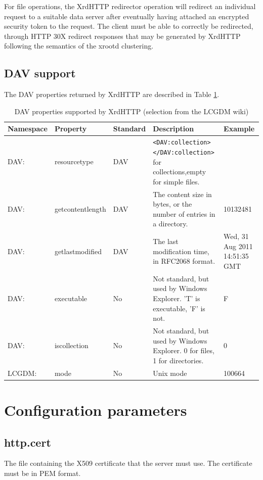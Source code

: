 \documentclass[12pt]{article} %
\begin{document}
 For file operations, the XrdHTTP redirector operation will redirect an individual request to a suitable data server after eventually having attached an encrypted security token to the request. The client must be able to correctly be redirected, through HTTP 30X redirect responses that may be generated by XrdHTTP following the semantics of the xrootd clustering.


\subsection{DAV support}

 The DAV properties returned by XrdHTTP are described in Table \ref{tableDAVprops}.

\begin{table}
    \begin{tabular}{|l|l|l|p{4cm}|p{2cm}|}
        \hline
        Namespace & Property & Standard & Description & Example \\ \hline

DAV:	 & resourcetype & DAV & \verb"<DAV:collection>"\newline\verb"</DAV:collection>" for collections,\newline empty for simple files. & ~	 \\
DAV:	 & getcontentlength & DAV & The content size in bytes, or the number of entries in a directory. & 10132481 \\
DAV: & 	getlastmodified & DAV & The last modification time, in RFC2068 format. & Wed, 31 Aug 2011 14:51:35 GMT \\
DAV:	 & executable & No & Not standard, but used by Windows Explorer. 'T' is executable, 'F' is not. & F \\
DAV:	 & iscollection & No & Not standard, but used by Windows Explorer. 0 for files, 1 for directories. & 0 \\
LCGDM: & mode & No & Unix mode &100664 \\

        \hline
    \end{tabular}
    \caption{\label{tableDAVprops}DAV properties supported by XrdHTTP (selection from the LCGDM wiki)}
\end{table}


\section{\label{configref}Configuration parameters}

\subsection{http.cert}
The file containing the X509 certificate that the server must use. The certificate must be in PEM format.
\end{document}

